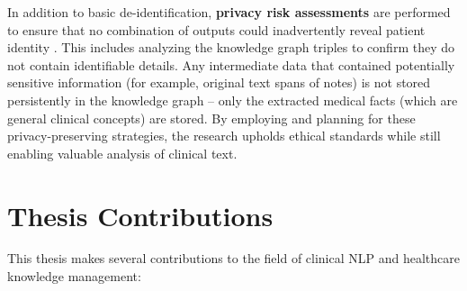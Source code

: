 In addition to basic de-identification, \textbf{privacy risk assessments} are performed to ensure that no combination of outputs could inadvertently reveal patient identity \parencite{Ali2024}. This includes analyzing the knowledge graph triples to confirm they do not contain identifiable details. Any intermediate data that contained potentially sensitive information (for example, original text spans of notes) is not stored persistently in the knowledge graph – only the extracted medical facts (which are general clinical concepts) are stored. By employing and planning for these privacy-preserving strategies, the research upholds ethical standards while still enabling valuable analysis of clinical text.


\section{Thesis Contributions}

This thesis makes several contributions to the field of clinical NLP and healthcare knowledge management:

